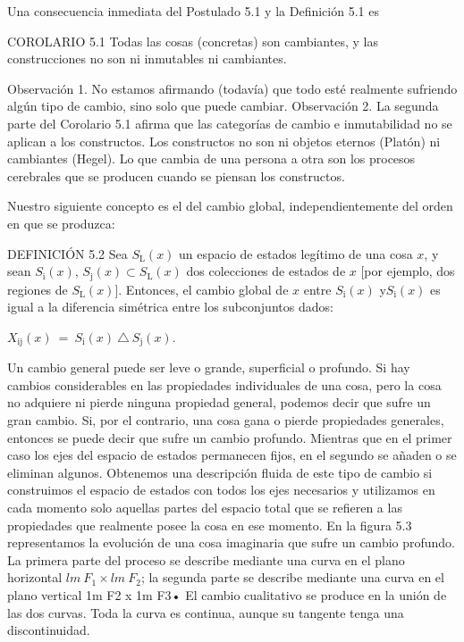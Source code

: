 \begin{justifying}
    Una consecuencia inmediata del Postulado 5.1 y la Definición 5.1 es

    \bigskip

    \noindent COROLARIO 5.1 Todas las cosas (concretas) son cambiantes, y las construcciones
    no son ni inmutables ni cambiantes.

    Observación 1. No estamos afirmando (todavía) que todo esté realmente
    sufriendo algún tipo de cambio, sino solo que puede cambiar. Observación
    2. La segunda parte del Corolario 5.1 afirma que las categorías de cambio
    e inmutabilidad no se aplican a los constructos. Los constructos no son ni
    objetos eternos (Platón) ni cambiantes (Hegel). Lo que cambia
    de una persona a otra son los procesos cerebrales que se producen cuando se piensan los constructos.

    Nuestro siguiente concepto es el del cambio global, independientemente del orden en que se produzca:

    \bigskip

    \noindent DEFINICIÓN 5.2 Sea $S_\mathrm{L}(x)$ un espacio de estados legítimo de una cosa $x$, y sean $S_\mathrm{i}(x)$, 
    $S_\mathrm{j}(x) \subset S_\mathrm{L}(x)$ dos colecciones de estados de $x$ [por ejemplo, dos regiones de
    $S_\mathrm{L}(x)$]. Entonces, el cambio global de $x$ entre $S_\mathrm{i}(x)$ y$S_\mathrm{i}(x)$ es igual a la
    diferencia simétrica entre los subconjuntos dados:

	\medskip

	$X_\mathrm{ij}(x) \:= \:S_\mathrm{i}(x) \:\triangle \: S_\mathrm{j}(x)$.

	\medskip

	Un cambio general puede ser leve o grande, superficial o profundo. Si
	hay cambios considerables en las propiedades individuales de una cosa, pero la
	cosa no adquiere ni pierde ninguna propiedad general, podemos decir que
	sufre un gran cambio. Si, por el contrario, una cosa gana o pierde
	propiedades generales, entonces se puede decir que sufre un cambio profundo.
	Mientras que en el primer caso los ejes del espacio de estados permanecen fijos, en el
	segundo se añaden o se eliminan algunos. Obtenemos una descripción fluida de
	este tipo de cambio si construimos el espacio de estados con todos los ejes necesarios
	y utilizamos en cada momento solo aquellas partes del espacio total que
	se refieren a las propiedades que realmente posee la cosa en ese momento. En la
	figura 5.3 representamos la evolución de una cosa imaginaria que sufre un
	cambio profundo. La primera parte del proceso se describe mediante una curva en el
	plano horizontal $lm \: F_\mathrm{1} \times lm \: F_\mathrm{2}$; la segunda parte se describe mediante una curva
	en el plano vertical 1m F2 x 1m F3• El cambio cualitativo se produce en la
	unión de las dos curvas. Toda la curva es continua, aunque
	su tangente tenga una discontinuidad.


\end{justifying}
